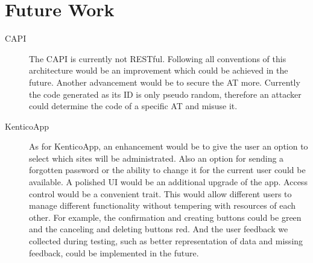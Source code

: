 \section{Future Work}
\begin{description}
\item[CAPI]The CAPI is currently not RESTful. Following all conventions of this architecture would be an improvement which could be achieved in the future. Another advancement would be to secure the AT more. Currently the code generated as its ID is only pseudo random, therefore an attacker could determine the code of a specific AT and misuse it. 
\item[KenticoApp] As for KenticoApp, an enhancement would be to give the user an option to select which sites will be administrated. Also an option for sending a forgotten password or the ability to change it for the current user could be available. A polished UI would be an additional upgrade of the app. Access control would be a convenient trait. This would allow different users to manage different functionality without tempering with resources of each other.
For example, the confirmation and creating buttons could be green and the canceling and deleting buttons red. And the user feedback we collected during testing, such as better representation of data and missing feedback, could be implemented in the future.
\end{description}
